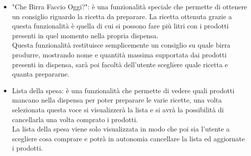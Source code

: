 \documentclass[a4paper, titlepage]{article}
\begin{document}
\begin{itemize}
    \item "Che Birra Faccio Oggi?":
        \subitem è una funzionalità speciale che permette di ottenere un consiglio riguardo la ricetta da preparare. La ricetta ottenuta grazie a questa funzionalità è quella di cui si possono fare più litri con i prodotti presenti in quel momento nella propria dispensa.\\
        Questa funzionalità restituisce semplicemente un consiglio su quale birra produrre, mostrando nome e quantità massima supportata dai prodotti presenti in dispensa, sarà poi facoltà dell’utente scegliere quale ricetta e quanta prepararne.
    \item Lista della spesa:
        \subitem è una funzionalità che permette di vedere quali prodotti mancano nella dispensa per poter preparare le varie ricette, una volta selezionata questa voce si visualizzerà la lista e si avrà la possibilità di cancellarla una volta comprato i prodotti.\\
        La lista della spesa viene solo visualizzata in modo che poi sia l'utente a scegliere cosa comprare e potrà in autonomia cancellare la lista ed aggiornate i prodotti.
\end{itemize}
\newpage
\end{document}
